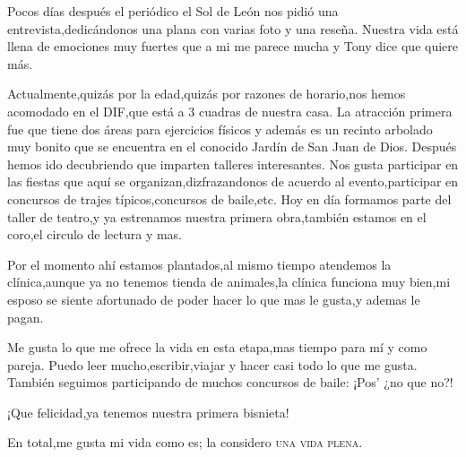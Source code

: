 \documentclass[letterpaper,12pt]{book}
\begin{document}
Pocos días después el periódico el Sol de León nos pidió una entrevista,dedicándonos una plana con varias foto y una reseña.
Nuestra vida está llena de emociones muy fuertes que a mi me parece mucha y Tony dice que quiere más.

Actualmente,quizás por la edad,quizás por razones de horario,nos hemos acomodado en el DIF,que está a 3 cuadras de nuestra casa. La atracción primera fue que tiene dos áreas para ejercicios físicos y además es un recinto arbolado muy bonito que se encuentra en el conocido Jardín de San Juan de Dios. Después hemos ido decubriendo que imparten talleres interesantes. Nos gusta participar en las fiestas que aquí se organizan,dizfrazandonos de acuerdo al evento,participar en concursos de trajes típicos,concursos de baile,etc.
Hoy en día formamos parte del taller de teatro,y ya estrenamos nuestra primera obra,también estamos en el coro,el circulo de lectura y mas.

Por el momento ahí estamos plantados,al mismo tiempo atendemos la clínica,aunque ya no tenemos tienda de animales,la clínica funciona muy bien,mi esposo se siente afortunado de poder hacer lo que mas le gusta,y ademas le pagan.

Me gusta lo que me ofrece la vida en esta etapa,mas tiempo para mí y como pareja. Puedo leer mucho,escribir,viajar y hacer casi todo lo que me gusta. También seguimos participando de muchos concursos de baile: ¡Pos' ¿no que no?!

¡Que felicidad,ya tenemos nuestra primera bisnieta!

En total,me gusta mi vida como es; la  considero \textsc{una vida plena}.
\end{document}
